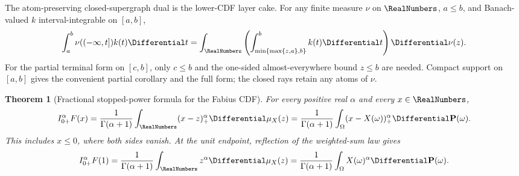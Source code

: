 \documentclass[11pt,oneside]{article}
\newtheorem{theorem}{Theorem}[section]
\theoremstyle{definition}
\theoremstyle{remark}
\begin{document}
The atom-preserving closed-supergraph dual is the lower-CDF layer cake.  For any finite
measure \(\nu\) on \(\RealNumbers\), \(a\le b\), and Banach-valued \(k\) interval-integrable on
\([a,b]\),
\begin{equation}
 \int_a^b \nu(({-\infty},t])k(t)\Differential t
 =\int_{\RealNumbers}\left(
   \int_{\min\{\max\{z,a\},b\}}^b k(t)\Differential t\right)\Differential\nu(z).
 \label{eq:cdf-layer-cake-clamp}
\end{equation}
For the partial terminal form on \([c,b]\), only \(c\le b\) and the one-sided
almost-everywhere bound \(z\le b\) are needed.  Compact support on \([a,b]\) gives the
convenient partial corollary and the full form; the closed rays retain any atoms of \(\nu\).

\begin{theorem}[Fractional stopped-power formula for the Fabius CDF]
\label{thm:fabius-fractional-stopped-power}
For every positive real \(\alpha\) and every \(x\in\RealNumbers\),
\begin{equation}
 I_{0+}^{\alpha}F(x)
 =\frac{1}{\Gamma(\alpha+1)}
   \int_{\RealNumbers}(x-z)_+^\alpha\Differential\mu_X(z)
 =\frac{1}{\Gamma(\alpha+1)}
   \int_{\Omega}(x-X(\omega))_+^\alpha\Differential\mathbf P(\omega).
 \label{eq:fabius-fractional-stopped-power}
\end{equation}
This includes \(x\le0\), where both sides vanish.  At the unit endpoint, reflection of
the weighted-sum law gives
\begin{equation}
 I_{0+}^{\alpha}F(1)
 =\frac{1}{\Gamma(\alpha+1)}\int_{\RealNumbers}z^\alpha\Differential\mu_X(z)
 =\frac{1}{\Gamma(\alpha+1)}
   \int_{\Omega}X(\omega)^\alpha\Differential\mathbf P(\omega).
 \label{eq:fabius-fractional-endpoint-moment}
\end{equation}
\end{theorem}
\end{document}
